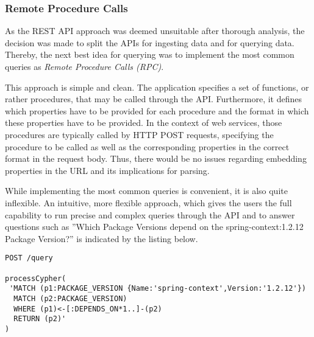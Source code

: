 \subsubsection{Remote Procedure Calls}
As the REST API approach was deemed unsuitable after thorough analysis, the decision was made to split the APIs for ingesting data and for querying data. Thereby, the next best idea for querying was to implement the most common queries as \emph{Remote Procedure Calls (RPC)}.\par 
This approach is simple and clean. The application specifies a set of functions, or rather procedures, that may be called through the API. Furthermore, it defines which properties have to be provided for each procedure and the format in which these properties have to be provided. In the context of web services, those procedures are typically called by HTTP POST requests, specifying the procedure to be called as well as the corresponding properties in the correct format in the request body. Thus, there would be no issues regarding embedding properties in the URL and its implications for parsing.\par
While implementing the most common queries is convenient, it is also quite inflexible. An intuitive, more flexible approach, which gives the users the full capability to run precise and complex queries through the API and to answer questions such as ''Which Package Versions depend on the spring-context:1.2.12 Package Version?'' is indicated by the listing below.\\

\begin{lstlisting}[caption=Exposing Cypher through API, captionpos=b, label=lst:CypherThroughAPI]
POST /query

processCypher(
 'MATCH (p1:PACKAGE_VERSION {Name:'spring-context',Version:'1.2.12'})
  MATCH (p2:PACKAGE_VERSION)
  WHERE (p1)<-[:DEPENDS_ON*1..]-(p2)
  RETURN (p2)'
)
\end{lstlisting}

